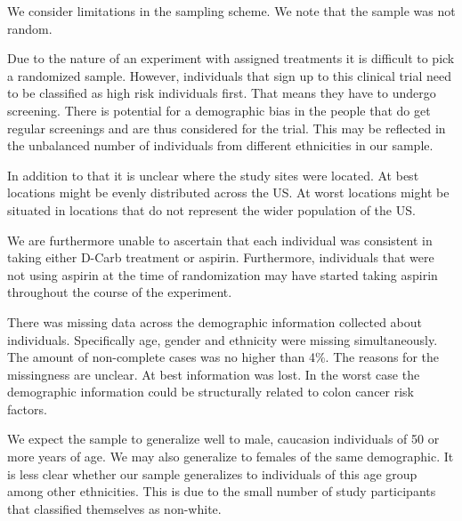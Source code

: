 \documentclass[paper=a4, fontsize=11pt]{scrartcl} %
\numberwithin{equation}{section} %
\numberwithin{figure}{section} %
\numberwithin{table}{section} %
\begin{document}
We consider limitations in the sampling scheme. We note that the sample was not random. 

Due to the nature of an experiment with assigned treatments it is difficult to pick a randomized sample. However, individuals that sign up to this clinical trial need to be classified as high risk individuals first. That means they have to undergo screening. There is potential for a demographic bias in the people that do get regular screenings and are thus considered for the trial. This may be reflected in the unbalanced number of individuals from different ethnicities in our sample.

In addition to that it is unclear where the study sites were located. At best locations might be evenly distributed across the US. At worst locations might be situated in locations that do not represent the wider population of the US.

We are furthermore unable to ascertain that each individual was consistent in taking either D-Carb treatment or aspirin. Furthermore, individuals that were not using aspirin at the time of randomization may have started taking aspirin throughout the course of the experiment.



There was missing data across the demographic information collected about individuals. Specifically age, gender and ethnicity were missing simultaneously. The amount of non-complete cases was no higher than 4\%. The reasons for the missingness are unclear. At best information was lost. In the worst case the demographic information could be structurally related to colon cancer risk factors.

We expect the sample to generalize well to male, caucasion individuals of 50 or more years of age. We may also generalize to females of the same demographic. It is less clear whether our sample generalizes to individuals of this age group among other ethnicities. This is due to the small number of study participants that classified themselves as non-white.
\end{document}
